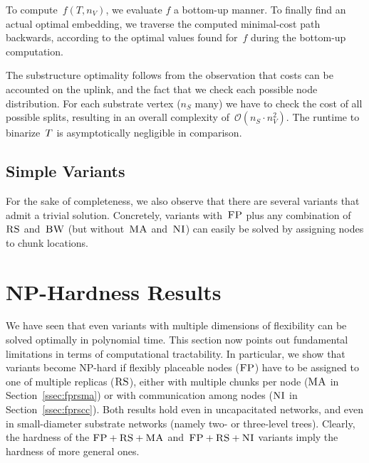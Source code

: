 To compute~$f(T, n_V)$, we evaluate $f$ a bottom-up manner. 
To finally find an actual optimal embedding,
we traverse the computed minimal-cost path backwards,
according to
the optimal values found for~$f$ during the bottom-up computation.


The substructure optimality follows from the observation that
costs can be accounted on the uplink, and the fact
 that we check each possible node distribution.
For each substrate vertex ($n_S$ many) we have
to check the cost of all possible splits,
resulting in an overall complexity of~$\mathcal{O}(n_S \cdot n_V^2)$.
The runtime to binarize~$T$ is asymptotically negligible in comparison.


\subsection{Simple Variants}



For the sake of completeness, we also observe that there are
several variants that admit a trivial solution. Concretely, variants with~$\textsc{FP}$
plus any combination of
$\textsc{RS}$ and~$\textsc{BW}$ (but without~$\textsc{MA}$ and~$\textsc{NI}$) can easily be solved by
assigning
nodes to chunk locations.

\section{NP-Hardness Results}\label{sec:np}

We have seen that even variants with multiple dimensions of
flexibility can be solved optimally in polynomial time.
This section now points out fundamental
limitations in terms of computational tractability.
In particular, we
show that variants become NP-hard if flexibly placeable nodes ($\textsc{FP}$) have to be assigned to one of multiple replicas ($\textsc{RS}$), either with multiple chunks per node ($\textsc{MA}$ in Section~\ref{ssec:fprsma}) or with communication among nodes ($\textsc{NI}$ in Section~\ref{ssec:fprscc}).
Both results hold even in uncapacitated networks, and even in small-diameter
substrate networks (namely two- or three-level trees).
Clearly, the hardness of the $\textsc{FP}+\textsc{RS}+\textsc{MA}$ and~$\textsc{FP}+\textsc{RS}+\textsc{NI}$ variants imply
the hardness of more general ones.

